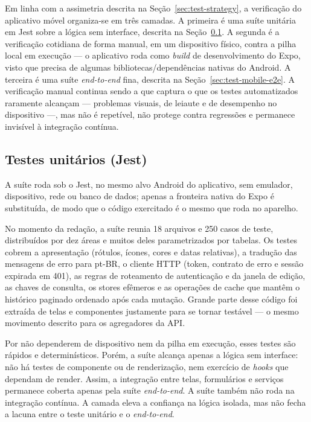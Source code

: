 Em linha com a assimetria descrita na Seção~\ref{sec:test-strategy}, a
verificação do aplicativo móvel organiza-se em três camadas. A primeira é uma
suíte unitária em Jest sobre a lógica sem interface, descrita na
Seção~\ref{sec:test-mobile-unit}. A segunda é a verificação cotidiana de forma
manual, em um dispositivo físico, contra a pilha local em execução --- o
aplicativo roda como \textit{build} de desenvolvimento do Expo, visto que
precisa de algumas bibliotecas/dependências nativas do Android. A terceira é
uma suíte \textit{end-to-end} fina, descrita na Seção~\ref{sec:test-mobile-e2e}.
A verificação manual continua sendo a que captura o que os testes automatizados
raramente alcançam --- problemas visuais, de leiaute e de desempenho no
dispositivo ---, mas não é repetível, não protege contra regressões e permanece
invisível à integração contínua.

\subsection{Testes unitários (Jest)}\label{sec:test-mobile-unit}

A suíte roda sob o Jest, no mesmo alvo Android do aplicativo, sem emulador,
dispositivo, rede ou banco de dados; apenas a fronteira nativa do Expo é
substituída, de modo que o código exercitado é o mesmo que roda no aparelho.

No momento da redação, a suíte reunia 18 arquivos e 250 casos de teste,
distribuídos por dez áreas e muitos deles parametrizados por tabelas. Os
testes cobrem a apresentação (rótulos, ícones, cores e datas relativas), a
tradução das mensagens de erro para pt-BR, o cliente HTTP (token, contrato de
erro e sessão expirada em 401), as regras de roteamento de autenticação e da
janela de edição, as chaves de consulta, os stores efêmeros e as operações de
cache que mantêm o histórico paginado ordenado após cada mutação. Grande parte
desse código foi extraída de telas e componentes justamente para se tornar
testável --- o mesmo movimento descrito para os agregadores da API.

Por não dependerem de dispositivo nem da pilha em execução, esses testes são
rápidos e determinísticos. Porém, a suíte alcança apenas a lógica sem
interface: não há testes de componente ou de renderização, nem exercício de
\textit{hooks} que dependam de render. Assim, a integração entre telas,
formulários e serviços permanece coberta apenas pela suíte
\textit{end-to-end}. A suíte também não roda na integração contínua. A camada
eleva a confiança na lógica isolada, mas não fecha a lacuna entre o teste
unitário e o \textit{end-to-end}.

